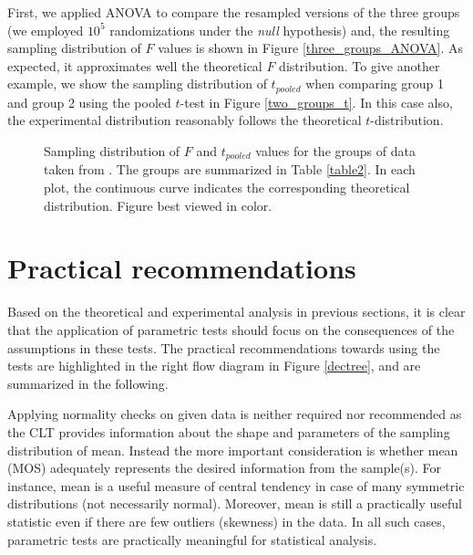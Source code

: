 \documentclass[10pt,final,Twcolumn]{IEEEtran}
\begin{document}
First, we applied ANOVA to compare the resampled versions of the three groups (we employed $10^5$ randomizations under the {\it{null}} hypothesis) and, the resulting sampling distribution of $F$ values is shown in Figure \ref{three_groups_ANOVA}. As expected, it approximates well the theoretical $F$ distribution. To give another example, we show the sampling distribution of $t_{pooled}$ when comparing group 1 and group 2 using the pooled $t$-test in Figure \ref{two_groups_t}. In this case also, the experimental distribution reasonably follows the theoretical $t$-distribution.  


\begin{figure*}[!]
\centering
\hfil
{}
\caption{Sampling distribution of $F$ and $t_{pooled}$ values for the groups of data taken from \cite{Pitrey}. The groups are summarized in Table \ref{table2}. In each plot, the continuous curve indicates the corresponding theoretical distribution. Figure best viewed in color.}
\label{sampling distribution of F and t}
\end{figure*}

\section{Practical recommendations} \label{recommendations}

Based on the theoretical and experimental analysis in previous sections, it is clear that the application of parametric tests should focus on the consequences of the assumptions in these tests. The practical recommendations towards using the tests are highlighted in the right flow diagram in Figure \ref{dectree}, and are summarized in the following.


Applying normality checks on given data is neither required nor recommended as the CLT provides information about the shape and parameters of the sampling distribution of mean. Instead the more important consideration is whether mean (MOS) adequately represents the desired information from the sample(s). For instance, mean is a useful measure of central tendency in case of many symmetric distributions (not necessarily normal). Moreover, mean is still a practically useful statistic even if there are few outliers (skewness) in the data. In all such cases, parametric tests are practically meaningful for statistical analysis.  
\end{document}
